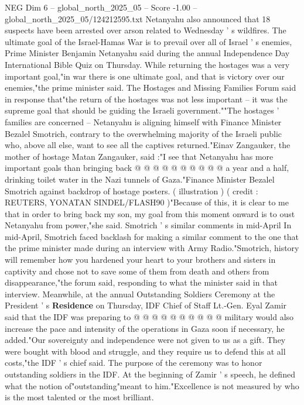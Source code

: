 \begin{textsample}{NEG Dim 6 – global\_north\_2025\_05 – Score -1.00 – global\_north\_2025\_05/124212595.txt}  \label{ex:f6_neg_416}
Netanyahu also announced that 18 suspects have been arrested over arson related to Wednesday ' s wildfires.
The ultimate goal of the Israel-Hamas War is to prevail over all of Israel ' s enemies, Prime Minister Benjamin Netanyahu said during the annual Independence Day International Bible Quiz on Thursday.
While returning the hostages was a very important goal,"in war there is one ultimate goal, and that is victory over our enemies,"the prime minister said.
The Hostages and Missing Families Forum said in response that"the return of the hostages was not less important -- it was the supreme goal that should be guiding the Israeli government.""The hostages ' families are concerned -- Netanyahu is aligning himself with Finance Minister Bezalel Smotrich, contrary to the overwhelming majority of the Israeli public who, above all else, want to see all the captives returned."Einav Zangauker, the mother of hostage Matan Zangauker, said :"I see that Netanyahu has more important goals than bringing back @ @ @ @ @ @ @ @ @ @ a year and a half, drinking toilet water in the Nazi tunnels of Gaza."Finance Minister Bezalel Smotrich against backdrop of hostage posters. ( illustration ) ( credit : REUTERS, YONATAN SINDEL/FLASH90 )"Because of this, it is clear to me that in order to bring back my son, my goal from this moment onward is to oust Netanyahu from power,"she said.
Smotrich ' s similar comments in mid-April In mid-April, Smotrich faced backlash for making a similar comment to the one that the prime minister made during an interview with Army Radio."Smotrich, history will remember how you hardened your heart to your brothers and sisters in captivity and chose not to save some of them from death and others from disappearance,"the forum said, responding to what the minister said in that interview.
Meanwhile, at the annual Outstanding Soldiers Ceremony at the President ' s \textbf{Residence} on Thursday, IDF Chief of Staff Lt.-Gen.
Eyal Zamir said that the IDF was preparing to @ @ @ @ @ @ @ @ @ @ military would also increase the pace and intensity of the operations in Gaza soon if necessary, he added."Our sovereignty and independence were not given to us as a gift.
They were bought with blood and struggle, and they require us to defend this at all costs,"the IDF ' s chief said.
The purpose of the ceremony was to honor outstanding soldiers in the IDF.
At the beginning of Zamir ' s speech, he defined what the notion of"outstanding"meant to him."Excellence is not measured by who is the most talented or the most brilliant.

\end{textsample}
